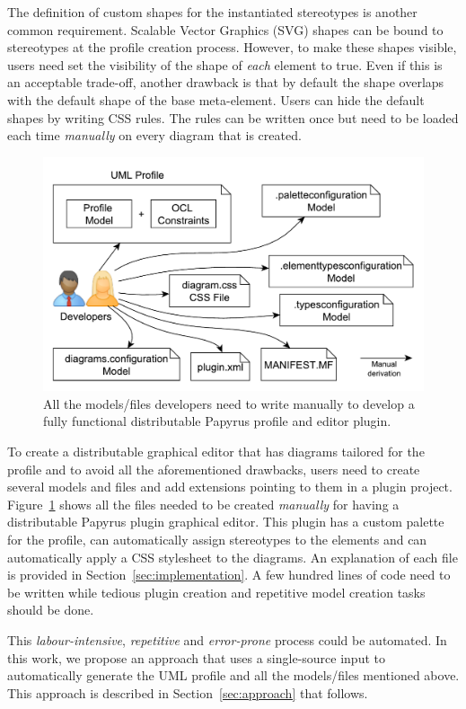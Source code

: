 
The definition of custom shapes for the instantiated stereotypes is another 
common requirement. Scalable Vector Graphics (SVG) shapes can be bound to 
stereotypes at the profile creation process. However, to make these shapes  
visible, users need set the visibility of the shape of \textit{each} element to true. Even if this is an 
acceptable trade-off, another drawback is that by default the shape overlaps 
with the default shape of the base meta-element. Users can hide the default 
shapes by writing CSS rules. The rules can 
be written once but need to be loaded each time \textit{manually} on every 
diagram that is created. 

\begin{figure}[t]
	\centering
	\includegraphics[width=1\textwidth]{diagrams/neededPapyrusFiles.pdf}
	\vspace{-3mm}
	\caption[]{All the models/files developers need to write manually to 
	develop a fully functional distributable Papyrus profile and editor plugin.}
	\label{fig:neededPapyrusFiles}
	\vspace*{-3mm}
\end{figure}

To create a distributable graphical editor that has diagrams tailored for the 
profile and to avoid all the aforementioned drawbacks, users need to create 
several models and files and add extensions pointing to them in a plugin 
project. Figure~\ref{fig:neededPapyrusFiles} shows all the files needed to be 
created \textit{manually} for having a distributable Papyrus plugin 
graphical editor. This plugin has a custom palette for the profile, can 
automatically assign stereotypes to the elements and can automatically 
apply a CSS stylesheet to the diagrams. 
An explanation of each file is provided in Section~\ref{sec:implementation}. A 
few hundred lines of code need to be written while tedious plugin creation and 
repetitive model creation tasks should be done. 


This \textit{labour-intensive}, \textit{repetitive} and \textit{error-prone} 
process could be automated. In this work, we propose an approach that uses a 
single-source input to automatically generate the UML profile and all the 
models/files mentioned above. This 
approach is described in Section~\ref{sec:approach} that follows. 
